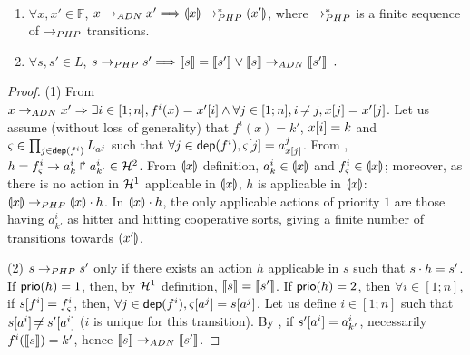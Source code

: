 \begin{theorem}[$\DNdef \approx \toPH\DNdef$]~
\label{thm:bisimDN}
\begin{enumerate}
\item $\forall x,x'\in\mathbb F$,
$x\rightarrow_{ADN} x' \Longrightarrow \llparenthesis x\rrparenthesis \rightarrow_{PHP}^* \llparenthesis x'\rrparenthesis$,
where $\rightarrow_{PHP}^*$ is a finite sequence of $\rightarrow_{PHP}$ transitions.

\item $\forall s,s'\in L$,
$s\rightarrow_{PHP} s' \Longrightarrow \llbracket s\rrbracket = \llbracket s'\rrbracket \vee \llbracket s\rrbracket \rightarrow_{ADN}
\llbracket s'\rrbracket\enspace.$
\end{enumerate}
\end{theorem}
\begin{proof}
(1) From  $x\rightarrow_{ADN} x'\Rightarrow \exists i\in[1;n],
f^i(x)=x'[{i}] \wedge \forall j\in[1;n],i\not\nobreak\mkern -2mu = j, x[{j}]=x'[{j}]$.
Let us assume (without loss of generality) that $f^i(x)=k'$, $x[{i}]=k$ and
$\varsigma\in\prod_{j\in\mathsf{dep}(f^i)} L_{a^j}$ such that
$\forall j\in\mathsf{dep}(f^i), \varsigma[{j}]=a^j_{x[{j}]}$.
From , $h=f^i_\varsigma\rightarrow a^i_k\Rsh a^i_{k'}\in\mathcal{H}^2$.
From $\llparenthesis x\rrparenthesis$ definition,
$a^i_k\in \llparenthesis x\rrparenthesis$ and $f^i_\varsigma\in \llparenthesis x\rrparenthesis$;
moreover, as there is no action in $\mathcal{H}^1$ applicable in $\llparenthesis x\rrparenthesis$,
$h$ is applicable in $\llparenthesis x\rrparenthesis$:
$\llparenthesis x\rrparenthesis\rightarrow_{PHP} \llparenthesis x\rrparenthesis\cdot h$.
In $\llparenthesis x\rrparenthesis\cdot h$, the only applicable actions of priority $1$ are those having
$a^i_{k'}$ as hitter and hitting cooperative sorts, giving a finite number of transitions towards
$\llparenthesis x'\rrparenthesis$.

(2) $s\rightarrow_{PHP} s'$ only if there exists an action $h$ applicable in $s$ such that
$s\cdot h=s'$.
If $\mathsf{prio}(h)=1$, then, by $\mathcal{H}^1$ definition, 
$\llbracket s\rrbracket=\llbracket s'\rrbracket$.
If $\mathsf{prio}(h)=2$, then $\forall i\in[1;n]$,
if $s[{f^i}] = f^i_\varsigma$, then, $\forall j\in\mathsf{dep}(f^i),
\varsigma[{a^j}]=s[{a^j}]$.
Let us define $i\in[1;n]$ such that $s[{a^i}]\not\nobreak\mkern -2mu =s'[{a^i}]$ ($i$ is unique for this
transition).
By , if $s'[{a^i}]=a^i_{k'}$, necessarily $f^i(\llbracket s\rrbracket)=k'$, hence
$\llbracket s\rrbracket\rightarrow_{ADN} \llbracket s'\rrbracket$.
\end{proof}


